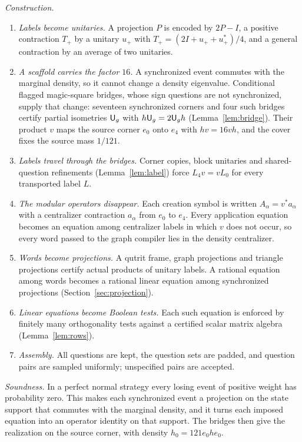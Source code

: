 \emph{Construction.}
\begin{enumerate}
\item \emph{Labels become unitaries.} A projection $P$ is encoded by $2P-I$, a positive contraction $T_+$ by a unitary $u_+$ with $T_+=(2I+u_++u_+^*)/4$, and a general contraction by an average of two unitaries.
\item \emph{A scaffold carries the factor $16$.} A synchronized event commutes with the marginal density, so it cannot change a density eigenvalue. Conditional flagged magic-square bridges, whose sign questions are not synchronized, supply that change: seventeen synchronized corners and four such bridges certify partial isometries ${\mathsf U}_g$ with $h{\mathsf U}_g=2{\mathsf U}_gh$ (Lemma~\ref{lem:bridge}). Their product $v$ maps the source corner $e_0$ onto $e_4$ with $hv=16vh$, and the cover fixes the source mass $1/121$.
\item \emph{Labels travel through the bridges.} Corner copies, block unitaries and shared-question refinements (Lemma~\ref{lem:label}) force $L_4v=vL_0$ for every transported label $L$.
\item \emph{The modular operators disappear.} Each creation symbol is written $A_\alpha=v^*a_\alpha$ with a centralizer contraction $a_\alpha$ from $e_0$ to $e_4$. Every application equation becomes an equation among centralizer labels in which $v$ does not occur, so every word passed to the graph compiler lies in the density centralizer.
\item \emph{Words become projections.} A qutrit frame, graph projections and triangle projections certify actual products of unitary labels. A rational equation among words becomes a rational linear equation among synchronized projections (Section~\ref{sec:projection}).
\item \emph{Linear equations become Boolean tests.} Each such equation is enforced by finitely many orthogonality tests against a certified scalar matrix algebra (Lemma~\ref{lem:rows}).
\item \emph{Assembly.} All questions are kept, the question sets are padded, and question pairs are sampled uniformly; unspecified pairs are accepted.
\end{enumerate}

\emph{Soundness.} In a perfect normal strategy every losing event of positive weight has probability zero. This makes each synchronized event a projection on the state support that commutes with the marginal density, and it turns each imposed equation into an operator identity on that support. The bridges then give the realization on the source corner, with density $h_0=121e_0he_0$.

